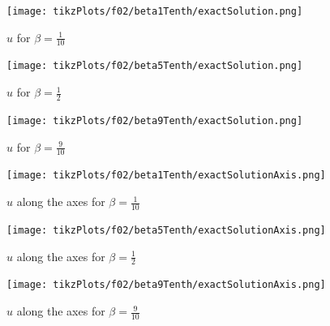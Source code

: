 \documentclass[draft=false,twoside,12pt]{scrreprt}
\begin{document}
\vspace{-\parskip}
\begin{minipage}[t]{0.3\textwidth}
  \begin{figure}[H]
	  \centering
    \texttt{[image: tikzPlots/f02/beta1Tenth/exactSolution.png]} 
    \caption{$u$ for $\beta=\frac{1}{10}$}
  \end{figure}
\end{minipage}
\hfill
\vline
\hfill
\begin{minipage}[t]{0.3\textwidth}
  \begin{figure}[H]
	  \centering
    \texttt{[image: tikzPlots/f02/beta5Tenth/exactSolution.png]} 
    \caption{$u$ for $\beta=\frac{1}{2}$}
  \end{figure}
\end{minipage}
\hfill
\vline
\hfill
\begin{minipage}[t]{0.3\textwidth}
  \begin{figure}[H]
	  \centering
    \texttt{[image: tikzPlots/f02/beta9Tenth/exactSolution.png]} 
    \caption{$u$ for $\beta=\frac{9}{10}$}
  \end{figure}
\end{minipage}

\vspace{-\parskip}
\begin{minipage}[t]{0.3\textwidth}
  \begin{figure}[H]
	  \centering
		\texttt{[image: tikzPlots/f02/beta1Tenth/exactSolutionAxis.png]} 
    \caption{$u$ along the axes for $\beta=\frac{1}{10}$}
  \end{figure}
\end{minipage}
\hfill
\vline
\hfill
\begin{minipage}[t]{0.3\textwidth}
  \begin{figure}[H]
	  \centering
		\texttt{[image: tikzPlots/f02/beta5Tenth/exactSolutionAxis.png]} 
    \caption{$u$ along the axes for $\beta=\frac{1}{2}$}
  \end{figure}
\end{minipage}
\hfill
\vline
\hfill
\begin{minipage}[t]{0.3\textwidth}
  \begin{figure}[H]
	  \centering
		\texttt{[image: tikzPlots/f02/beta9Tenth/exactSolutionAxis.png]} 
    \caption{$u$ along the axes for $\beta=\frac{9}{10}$}
  \end{figure}
\end{minipage}
\end{document}
